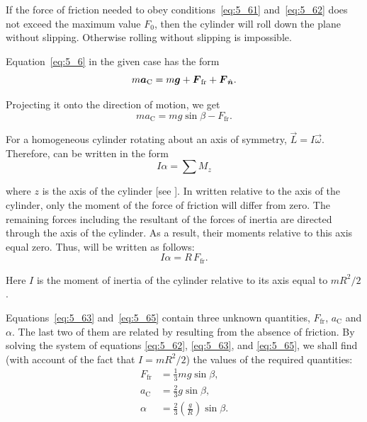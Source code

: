 If the force of friction needed to obey conditions~\eqref{eq:5_61} and~\eqref{eq:5_62} does not exceed the maximum value $F_0$, then the cylinder will roll down the plane without slipping. Otherwise rolling without slipping is impossible.

Equation~\eqref{eq:5_6} in the given case has the form
\begin{equation*}
	m\boldsymbol{a}_{\text{C}} = m\boldsymbol{g} + \boldsymbol{F}_{\text{fr}} + \boldsymbol{F}_{\hat{\boldsymbol{n}}}.
\end{equation*}

\noindent
Projecting it onto the direction of motion, we get
\begin{equation}\label{eq:5_63}
	ma_{\text{C}} = mg\sin\beta - F_{\text{fr}}.
\end{equation}

For a homogeneous cylinder rotating about an axis of symmetry, $\vec{L}=I\vec{\omega}$. Therefore,  can be written in the form
\begin{equation}\label{eq:5_64}
	I\alpha = \sum M_z
\end{equation}

\noindent
where $z$ is the axis of the cylinder [see ]. In  written relative to the axis of the cylinder, only the moment of the force of friction will differ from zero. The remaining forces including the resultant of the forces of inertia are directed through the axis of the cylinder. As a result, their moments relative to this axis equal zero. Thus,  will be written as follows:
\begin{equation}\label{eq:5_65}
	I\alpha = R\,F_{\text{fr}}.
\end{equation}

\noindent
Here $I$ is the moment of inertia of the cylinder relative to its axis equal to $mR^2/2$.

Equations~\eqref{eq:5_63} and~\eqref{eq:5_65} contain three unknown quantities, $F_{\text{fr}}$, $a_{\text{C}}$ and $\alpha$. The last two of them are related by  resulting from the absence of friction. By solving the system of equations \eqref{eq:5_62}, \eqref{eq:5_63}, and \eqref{eq:5_65}, we shall find (with account of the fact that $I=mR^2/2$) the values of the required quantities:
\begin{align}
	F_{\text{fr}} &= \frac{1}{3} m g \sin\beta, \label{eq:5_66}\\
	a_{\text{C}} &= \frac{2}{3} g \sin\beta, \label{eq:5_67}\\
	\alpha &= \frac{2}{3}\left(\frac{g}{R}\right)\sin\beta. \label{eq:5_68}
\end{align}


